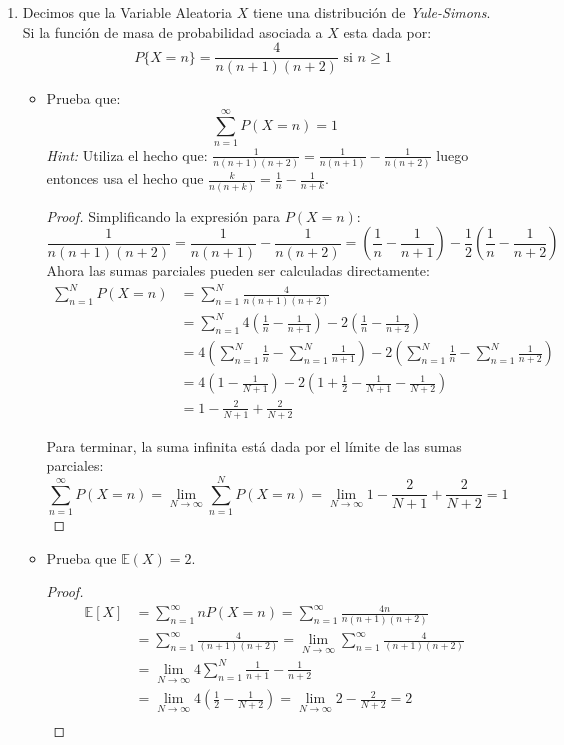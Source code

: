 \documentclass[11pt,letterpaper]{report}
\begin{document}
\begin{enumerate}
\item Decimos que la Variable Aleatoria $X$ tiene una distribución de \emph{Yule-Simons}. Si la
función de masa de probabilidad asociada a $X$ esta dada por:
\[
    P\{ X=n \} = \frac{4}{n(n+1)(n+2)} \text{ si } n \geq 1
\]
\begin{itemize}
    \item Prueba que:
    \[
        \sum_{n=1}^{\infty} P(X = n) = 1
    \]
    \textit{Hint:} Utiliza el hecho que: $\frac{1}{n(n+1)(n+2)} = \frac{1}{n(n+1)} - \frac{1}{n(n+2)}$
    luego entonces usa el hecho que $\frac{k}{n(n+k)} = \frac{1}{n} - \frac{1}{n+k}$.
    \begin{proof}
        Simplificando la expresión para $P(X=n)$:
        \[
            \frac{1}{n(n+1)(n+2)} = \frac{1}{n(n+1)} - \frac{1}{n(n+2)} =
            (\frac{1}{n} - \frac{1}{n+1}) - \frac{1}{2}(\frac{1}{n} - \frac{1}{n+2})
        \]
        Ahora las sumas parciales pueden ser calculadas directamente:
        \begin{align*}
            \sum_{n=1}^{N} P(X = n)
                &= \sum_{n=1}^{N} \frac{4}{n(n+1)(n+2)}\\
                &= \sum_{n=1}^{N} 4 (\frac{1}{n} - \frac{1}{n+1}) - 2 (\frac{1}{n} - \frac{1}{n+2})\\
                &= 4 (\sum_{n=1}^{N} \frac{1}{n} - \sum_{n=1}^{N} \frac{1}{n+1}) - 2 (\sum_{n=1}^{N} \frac{1}{n} - \sum_{n=1}^{N} \frac{1}{n+2})\\
                &= 4 (1 - \frac{1}{N+1}) - 2 (1 + \frac{1}{2} - \frac{1}{N+1} - \frac{1}{N+2})\\
                &= 1 - \frac{2}{N+1} + \frac{2}{N+2}
        \end{align*}

        Para terminar, la suma infinita está dada por el límite de las sumas parciales:
        \[
            \sum_{n=1}^{\infty} P(X = n) = \lim_{N \to \infty} \sum_{n=1}^{N} P(X=n) =
            \lim_{N \to \infty} 1 - \frac{2}{N+1} + \frac{2}{N+2} = 1
        \]
    \end{proof}

    \item Prueba que $\mathds{E}(X) = 2$.
    \begin{proof}
        \begin{align*}
            \mathds{E}[X]
                &= \sum_{n=1}^{\infty} n P(X = n) = \sum_{n=1}^{\infty} \frac{4n}{n(n+1)(n+2)}\\
                &= \sum_{n=1}^{\infty} \frac{4}{(n+1)(n+2)} = \lim_{N \to \infty} \sum_{n=1}^{\infty} \frac{4}{(n+1)(n+2)}\\
                &= \lim_{N \to \infty} 4 \sum_{n=1}^{N} \frac{1}{n+1} - \frac{1}{n+2}\\
                &= \lim_{N \to \infty} 4 (\frac{1}{2} - \frac{1}{N+2}) = \lim_{N \to \infty} 2 - \frac{2}{N+2} = 2\\
        \end{align*}
    \end{proof}


\end{itemize}
\end{enumerate}
\end{document}
